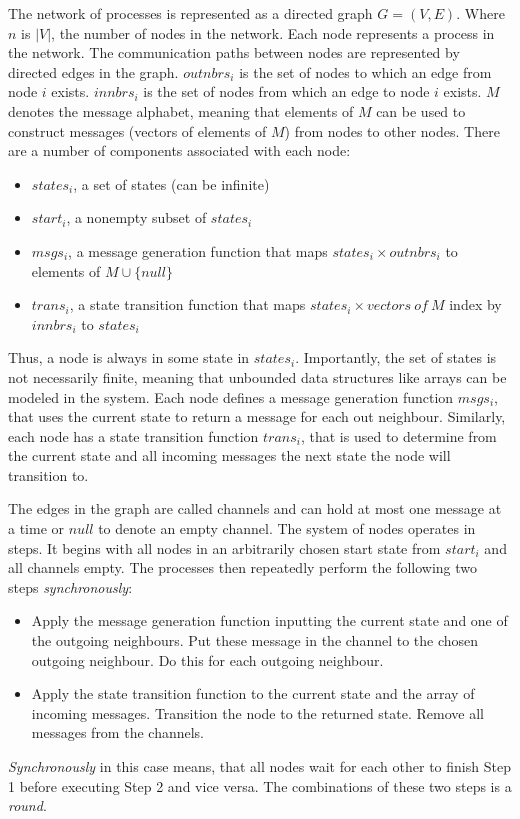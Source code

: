 \documentclass[fleqn]{article}
\begin{document}
The network of processes is represented as a directed graph $G=(V,E)$. Where $n$ is $|V|$, the number of nodes in the network. Each node represents a process in the network.
The communication paths between nodes are represented by directed edges in the graph.
$outnbrs_i$ is the set of nodes to which an edge from node $i$ exists.
$innbrs_i$ is the set of nodes from which an edge to node $i$ exists.
$M$ denotes the message alphabet, meaning that elements of $M$ can be used to construct messages (vectors of elements of $M$) from nodes to other nodes.
There are a number of components associated with each node:
\begin{itemize}
    \item $states_i$, a set of states (can be infinite)
    \item $start_i$, a nonempty subset of $states_i$
    \item $msgs_i$, a message generation function that maps $states_i \times outnbrs_i$ to elements of $M \cup \{null\}$
    \item $trans_i$, a state transition function that maps $states_i \times vectors\ of\ M$ index by $innbrs_i$ to $states_i$
\end{itemize}
Thus, a node is always in some state in $states_i$. Importantly, the set of states is not necessarily finite, meaning that unbounded data structures like arrays can be modeled in the system.
Each node defines a message generation function $msgs_i$, that uses the current state to return a message for each out neighbour. Similarly, each node has a state transition function $trans_i$, that is used to determine
from the current state and all incoming messages the next state the node will transition to.

The edges in the graph are called channels and can hold at most one message at a time or $null$ to denote an empty channel.
The system of nodes operates in steps. It begins with all nodes in an arbitrarily chosen start state from $start_i$ and all channels empty.
The processes then repeatedly perform the following two steps \textit{synchronously}:
\begin{itemize}
  \item Apply the message generation function inputting the current state and one of the outgoing neighbours. Put these message in the channel to the chosen outgoing neighbour. Do this for each outgoing neighbour.
  \item Apply the state transition function to the current state and the array of incoming messages. Transition the node to the returned state. Remove all messages from the channels.
\end{itemize}
\textit{Synchronously} in this case means, that all nodes wait for each other to finish Step 1 before executing Step 2 and vice versa.
The combinations of these two steps is a \textit{round}.
\end{document}
